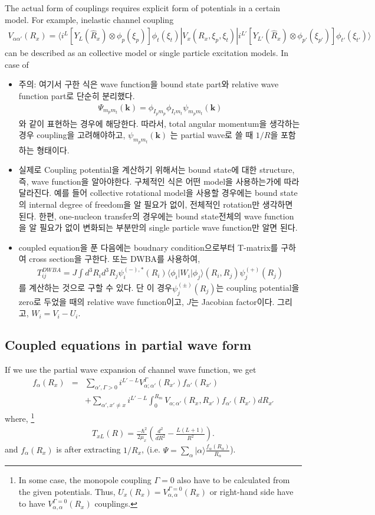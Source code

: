 \documentclass[11pt]{book}
\def\bm{\boldsymbol}
\def\vk{{\bm k}}
\def\la{\langle}
\def\ra{\rangle}
\newcommand{\bea}{\begin{eqnarray}}
\newcommand{\eea}{\end{eqnarray}}
\newcommand{\no}{\nonumber \\}
\begin{document}
The actual form of couplings requires explicit form of potentials in a certain model.
For example, inelastic channel coupling
\bea 
V_{\alpha\alpha'}(R_x)=\la i^{L} [Y_L(\hat{R}_x)\otimes \phi_p(\xi_p)]\phi_t(\xi_t)|
    V_x(R_x,\xi_p,\xi_t)|i^{L'} 
    [Y_{L'}(\hat{R}_{x})\otimes \phi_{p'}(\xi_{p'})]\phi_{t'}(\xi_{t'})\ra 
\eea 
can be described as an collective model or single particle excitation models. 
In case of 


\begin{itemize}
\item 주의: 여기서 구한 식은 wave function을 bound state part와 relative wave function part로 
단순히 분리했다.
\bea 
\Psi_{m_p m_t}(\vk)=\phi_{I_p m_p}\phi_{I_t m_t} \psi_{m_p m_t}(\vk)
\eea 
와 같이 표현하는 경우에 해당한다. 따라서, total angular momentum을 생각하는 경우
coupling을 고려해야하고,  $\psi_{m_p m_t}(\vk)$ 는 partial wave로 쓸 때 
$1/R$을 포함하는 형태이다.

\item 실제로 Coupling potential을 계산하기 위해서는 
      bound state에 대한 structure, 즉, wave function을 알아야한다. 
      구체적인 식은 어떤 model을 사용하는가에 따라 달라진다. 
      예를 들어 collective rotational model을 사용할 경우에는 
      bound state의 internal degree of freedom을 알 필요가 없이,
      전체적인 rotation만 생각하면 된다. 
      한편, one-nucleon transfer의 경우에는 bound state전체의 wave function
      을 알 필요가 없이 변화되는 부분만의 single particle wave function만 알면 된다. 
\item coupled equation을 푼 다음에는 boudnary condition으로부터 T-matrix를 구하여
      cross section을 구한다. 또는 DWBA를 사용하여,
      \bea 
      T_{ij}^{DWBA}
        = J \int d^3 R_i d^3 R_j \psi^{(-),*}_i(R_i) \la \phi_i| W_i|\phi_j\ra(R_i,R_j)  \psi^{(+)}_j(R_j)
      \eea
      를 계산하는 것으로 구할 수 있다. 단 이 경우$\psi^{(\pm)}_j(R_j)$는 
      coupling potential을 zero로 두었을 때의 relative wave function이고,
      $J$는 Jacobian factor이다. 
      그리고, $W_i=V_i-U_i$.
\end{itemize}
\subsection{Coupled equations in partial wave form}
If we use the partial wave expansion of channel wave  function, 
we get
\bea 
[E_{x p t}-T_{xL}(R_x)-U_x(R_x)]f_{\alpha}(R_x)
&=&\sum_{\alpha',\Gamma>0} i^{L'-L} V^{\Gamma}_{\alpha;\alpha'}(R_{x'})f_{\alpha'}(R_{x'})
\no & &
+\sum_{\alpha',x'\neq x} i^{L'-L}
 \int_0^{R_m} V_{\alpha;\alpha'}(R_x,R_{x'})
              f_{\alpha'}(R_{x'}) d R_{x'}
\eea 
where, \footnote{In some case, the monopole coupling $\Gamma=0$
also have to be calculated from the given potentials. Thus, 
$U_x(R_x)=V^{\Gamma=0}_{\alpha,\alpha}(R_x)$ or right-hand side have to have 
$V^{\Gamma=0}_{\alpha,\alpha}(R_x)$ couplings.
} 
\bea 
T_{xL}(R)=\frac{-\hbar^2}{2\mu_x}(\frac{d^2}{dR^2}-\frac{L(L+1)}{R^2}).
\eea 
and $f_{\alpha}(R_x)$ is after extracting $1/R_x$, (i.e. 
$\Psi=\sum_{\alpha}|\alpha\ra \frac{f_\alpha(R_\alpha)}{R_\alpha} $).
\end{document}
